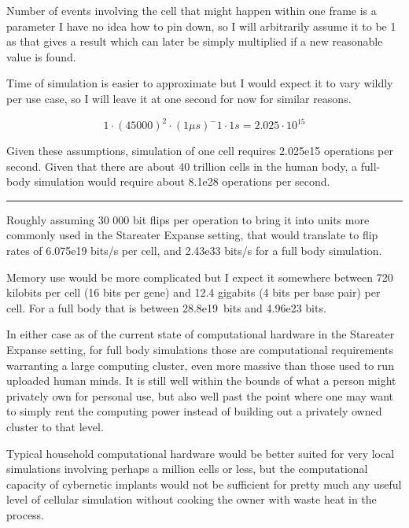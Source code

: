 \documentclass[a4paper]{article}
\begin{document}
	\medskip
	
	Number of events involving the cell that might happen within one frame is a parameter I have no idea how to pin down, so I will arbitrarily assume it to be 1 as that gives a result which can later be simply multiplied if a new reasonable value is found.
	
	\medskip
	
	Time of simulation is easier to approximate but I would expect it to vary wildly per use case, so I will leave it at one second for now for similar reasons.
	
	$$ 1 \cdot (45 000)^2 \cdot (1\mu s)^-1 \cdot 1s = 2.025 \cdot 10^{15} $$
	
	Given these assumptions, simulation of one cell requires 2.025e15 operations per second. Given that there are about 40 trillion cells in the human body, a full-body simulation would require about 8.1e28 operations per second.
	
	\medskip
	
	\noindent\rule{\linewidth}{1pt}
	
	\medskip
	
	Roughly assuming 30 000 bit flips per operation to bring it into units more commonly used in the Stareater Expanse setting, that would translate to flip rates of 6.075e19 bits/s per cell, and 2.43e33 bits/s for a full body simulation.
	
	\medskip
	
	Memory use would be more complicated but I expect it somewhere between 720 kilobits per cell (16 bits per gene) and 12.4 gigabits (4 bits per base pair) per cell. For a full body that is between 28.8e19~bits and 4.96e23 bits.
	
	\medskip
	
	In either case as of the current state of computational hardware in the Stareater Expanse setting, for full body simulations those are computational requirements warranting a large computing cluster, even more massive than those used to run uploaded human minds. It is still well within the bounds of what a person might privately own for personal use, but also well past the point where one may want to simply rent the computing power instead of building out a privately owned cluster to that level.
	
	\medskip
	
	Typical household computational hardware would be better suited for very local simulations involving perhaps a million cells or less, but the computational capacity of cybernetic implants would not be sufficient for pretty much any useful level of cellular simulation without cooking the owner with waste heat in the process.
	
\end{document}
